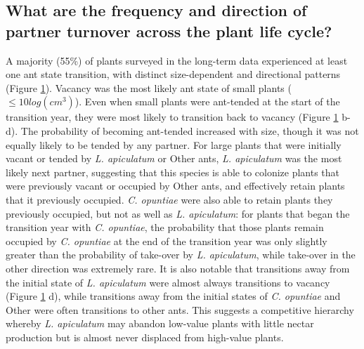 \documentclass[11pt]{article}
\begin{document}
\subsection*{What are the frequency and direction of partner turnover across the plant life cycle?}
A majority (55\%) of plants surveyed in the long-term data experienced at least one ant state transition, with distinct size-dependent and directional patterns (Figure \ref{fig:Ant_Transition}). 
Vacancy was the most likely ant state of small plants ($\leq 10 log(cm^3)$).
Even when small plants were ant-tended at the start of the transition year, they were most likely to transition back to vacancy (Figure \ref{fig:Ant_Transition} b-d). 
The probability of becoming ant-tended increased with size, though it was not equally likely to be tended by any partner.  
For large plants that were initially vacant or tended by \textit{L. apiculatum} or Other ants, \textit{L. apiculatum} was the most likely next partner, suggesting that this species is able to colonize plants that were previously vacant or occupied by Other ants, and effectively retain plants that it previously occupied.  
\textit{C. opuntiae} were also able to retain plants they previously occupied, but not as well as \textit{L. apiculatum}: for plants that began the transition year with \textit{C. opuntiae}, the probability that those plants remain occupied by \textit{C. opuntiae} at the end of the transition year was only slightly greater than the probability of take-over by \textit{L. apiculatum}, while take-over in the other direction was extremely rare. 
It is also notable that transitions away from the initial state of \textit{L. apiculatum} were almost always transitions to vacancy (Figure \ref{fig:Ant_Transition} d), while transitions away from the initial states of \textit{C. opuntiae} and Other  were often transitions to other ants. 
This suggests a competitive hierarchy whereby \textit{L. apiculatum} may abandon low-value plants with little nectar production but is almost never displaced from high-value plants. 

\begin{figure}[H]
	\caption{}
	\label{fig:Ant_Transition}
\end{figure}
\end{document}
